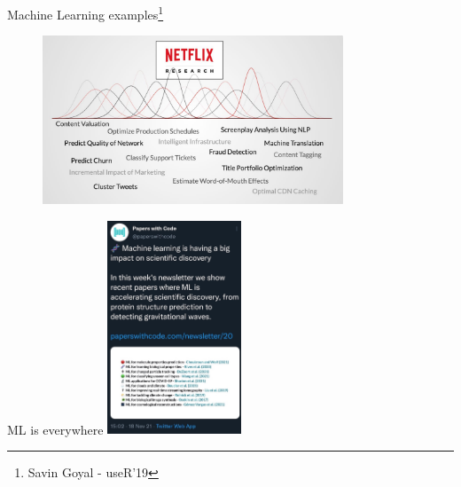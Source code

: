 \documentclass[
  9pt,
  ignorenonframetext,
  aspectratio=169,
  t, dvipsnames]{beamer}
\theoremstyle{definition}
\begin{document}
\begin{frame}{Machine Learning examples\footnote{Savin Goyal - useR'19}}
\protect\hypertarget{machine-learning-examples-3}{}
\begin{figure}

{\centering \includegraphics[width=0.8\textwidth,height=\textheight]{img/netflix3.png}

}

\end{figure}
\end{frame}

\begin{frame}{ML is everywhere}
\protect\hypertarget{ml-is-everywhere}{}
\includegraphics[width=0.3\textwidth,height=\textheight]{img/Screenshot_20211118-215613_Twitter.jpg}
\end{frame}
\end{document}
